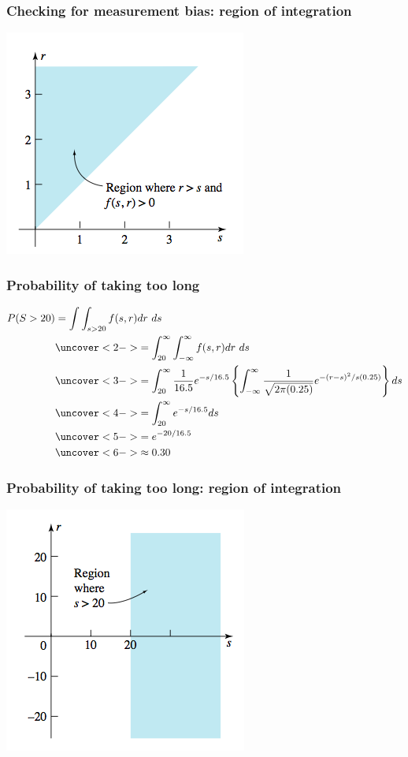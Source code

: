 \documentclass[handout]{beamer}\usepackage[]{graphicx}\usepackage[]{color}
\numberwithin{equation}{section}
\begin{document}
\begin{frame}
\frametitle{Checking for measurement bias: region of integration}
 \includegraphics{../../fig/intregion1.png}
\end{frame}

\begin{frame}
\frametitle{Probability of taking too long} \scriptsize
\begin{align*}
P(S > 20) &= \int \int_{s > 20} f(s, r) dr \ ds \\
&\uncover<2->{= \int_{20}^\infty \int_{-\infty}^\infty f(s, r) dr \ ds} \\
&\uncover<3->{=\int_{20}^\infty \frac{1}{16.5} e^{-s/16.5} \left \{\int_{-\infty}^\infty \frac{1}{\sqrt{2 \pi (0.25)}} e^{-(r-s)^2/s(0.25)} \right \} ds} \\
&\uncover<4->{=\int_{20}^\infty e^{-s/16.5} ds} \\
&\uncover<5->{=e^{-20/16.5}} \\
&\uncover<6->{\approx 0.30}
\end{align*}
\end{frame}

\begin{frame}
\frametitle{Probability of taking too long: region of integration}
 \includegraphics{../../fig/intregion2.png}
\end{frame}
\end{document}
